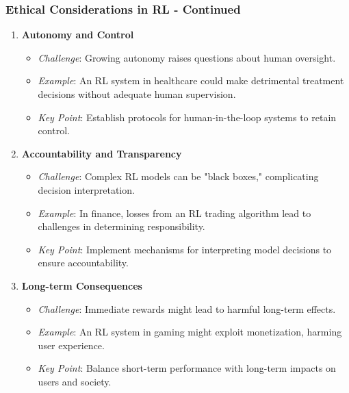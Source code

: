 \documentclass{beamer}
\begin{document}
\begin{frame}[fragile]
    \frametitle{Ethical Considerations in RL - Continued}
    \begin{enumerate}[resume]
        \item \textbf{Autonomy and Control}
            \begin{itemize}
                \item \textit{Challenge}: Growing autonomy raises questions about human oversight.
                \item \textit{Example}: An RL system in healthcare could make detrimental treatment decisions without adequate human supervision.
                \item \textit{Key Point}: Establish protocols for human-in-the-loop systems to retain control.
            \end{itemize}
        \item \textbf{Accountability and Transparency}
            \begin{itemize}
                \item \textit{Challenge}: Complex RL models can be "black boxes," complicating decision interpretation.
                \item \textit{Example}: In finance, losses from an RL trading algorithm lead to challenges in determining responsibility.
                \item \textit{Key Point}: Implement mechanisms for interpreting model decisions to ensure accountability.
            \end{itemize}
        \item \textbf{Long-term Consequences}
            \begin{itemize}
                \item \textit{Challenge}: Immediate rewards might lead to harmful long-term effects.
                \item \textit{Example}: An RL system in gaming might exploit monetization, harming user experience.
                \item \textit{Key Point}: Balance short-term performance with long-term impacts on users and society.
            \end{itemize}
    \end{enumerate}
\end{frame}
\end{document}

